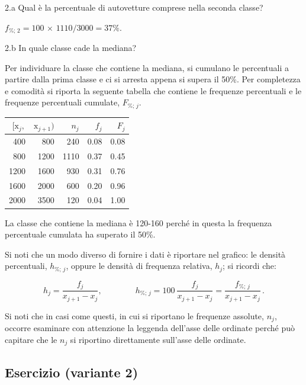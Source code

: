 \documentclass[
  11pt,
]{book}
\theoremstyle{mytheoremstyle}
\theoremstyle{mydefstyle}
\newenvironment{sol}
  {
  \begin{tcolorbox}[enhanced,breakable,arc=0.1mm,boxrule=1pt,colback=white,colframe=iblue,
  title=\bf \fontfamily{lmss}\selectfont \hspace{.5 cm} Soluzione,drop fuzzy shadow]

}{
\end{tcolorbox}
  }
\begin{document}
2.a Qual è la percentuale di autovetture comprese nella seconda classe?

\begin{sol}
\(f_{\%;\, 2} = 100 \,\times\, 1110/3000 = 37\%\).

\end{sol}

2.b In quale classe cade la mediana?

\begin{sol}
Per individuare la classe che contiene la mediana,
si cumulano le percentuali a partire dalla prima
classe e ci si arresta appena si supera il 50\%.
Per completezza e comodità si riporta la seguente
tabella che contiene le frequenze percentuali e le
frequenze percentuali cumulate, \(F_{\%;\, j}\).

\begin{tabular}{rrrrr}
\toprule
$[\text{x}_j,$ & $\text{x}_{j+1})$ & $n_j$ & $f_j$ & $F_j$\\
\midrule
400 & 800 & 240 & 0.08 & 0.08\\
800 & 1200 & 1110 & 0.37 & 0.45\\
1200 & 1600 & 930 & 0.31 & 0.76\\
1600 & 2000 & 600 & 0.20 & 0.96\\
2000 & 3500 & 120 & 0.04 & 1.00\\
\bottomrule
\end{tabular}

La classe che contiene la mediana è 120-160 perché in questa
la frequenza percentuale cumulata ha superato il 50\%.

Si noti che un modo diverso di fornire i dati è riportare
nel grafico: le densità percentuali, \(h_{\%;\, j}\), oppure
le densità di frequenza relativa, \(h_{j}\); si ricordi che:

\begin{displaymath}
h_{j}       = \frac{f_{j}}  {x_{j+1} - x_{j}},  \qquad\qquad
h_{\%;\, j} = 100\ \frac{f_{j}}  {x_{j+1} - x_{j}}
            = \frac{f_{\%;\, j}} {x_{j+1} - x_{j}}\, .
\end{displaymath}

Si noti che in casi come questi, in cui si riportano le
frequenze assolute, \(n_{j}\), occorre esaminare con attenzione
la leggenda dell'asse delle ordinate perché può capitare
che le \(n_{j}\) si riportino direttamente sull'asse delle
ordinate.

\end{sol}

\subsection{Esercizio (variante 2)}\label{esercizio-variante-2}
\end{document}
